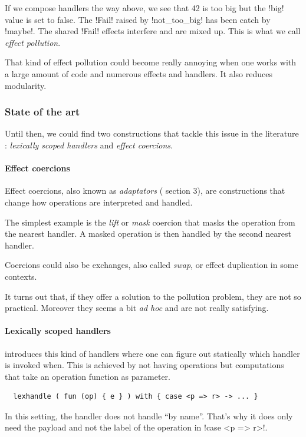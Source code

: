 \documentclass[11pt, nonacm=true, language=french, language=english]{acmart}
\begin{document}
If we compose handlers the way above, we see that 42 is too big but the !big! value is set to false. The !Fail! raised by !not_too_big! has been catch by !maybe!. The shared !Fail! effects interfere and are mixed up. This is what we call \emph{effect pollution}.

That kind of effect pollution could become really annoying when one works with a large amount of code and numerous effects and handlers. It also reduces modularity.

\subsubsection{State of the art}
\label{sec:state-art}

Until then, we could find two constructions that tackle this issue in the literature : \emph{lexically scoped handlers} and \emph{effect coercions}.

\paragraph{Effect coercions}
Effect coercions, also known as \emph{adaptators} (\citep{doobeedoo} section 3), are constructions that change how operations are interpreted and handled.

The simplest example is the \emph{lift} or \emph{mask} coercion that masks the operation from the nearest handler. A masked operation is then handled by the second nearest handler.

Coercions could also be exchanges, also called \emph{swap}, or effect duplication in some contexts.

It turns out that, if they offer a solution to the pollution problem, they are not so practical. Moreover they seems a bit \emph{ad hoc} and are not really satisfying.

\paragraph{Lexically scoped handlers}
\cite{lex-eff} introduces this kind of handlers where one can figure out statically which handler is invoked when. This is achieved by not having operations but computations that take an operation function as parameter.
\begin{lstlisting}
  lexhandle ( fun (op) { e } ) with { case <p => r> -> ... }
\end{lstlisting}
\begin{rem}
  In this setting, the handler does not handle ``by name''. That's why it does only need the payload and not the label of the operation in !case <p => r>!.
\end{rem}
\end{document}
